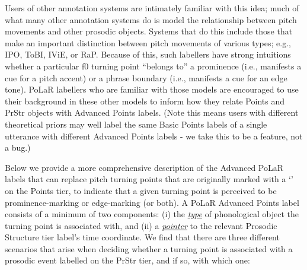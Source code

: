 \documentclass[11pt, twoside]{memoir}
\def\textlabel#1{{\relsize{-.5}\fontspec[Mapping=tex-text]{Roboto Mono}{#1}}}
\begin{document}
Users of other annotation systems are intimately familiar with this idea; much of what many other annotation systems do is model the relationship between pitch movements and other prosodic objects. Systems that do this include those that make an important distinction between pitch movements of various types; e.g., IPO, ToBI, IViE, or RaP. Because of this, such labellers have strong intuitions whether a particular f0 turning point “belongs to” a prominence (i.e., manifests a cue for a pitch accent) or a phrase boundary (i.e., manifests a cue for an edge tone). PoLaR labellers who are familiar with those models are encouraged to use their background in these other models to inform how they relate Points and PrStr objects with Advanced Points labels. (Note this means users with different theoretical priors may well label the same Basic Points labels of a single utterance with different Advanced Points labels - we take this to be a feature, not a bug.)

Below we provide a more comprehensive description of the Advanced PoLaR labels that can replace pitch turning points that are originally marked with a ‘\textlabel{0}’ on the Points tier, to indicate that a given turning point is perceived to be prominence-marking or edge-marking (or both). A PoLaR Advanced Points label consists of a minimum of two components: (i) the \textit{\uline{type}} of phonological object the turning point is associated with, and (ii) a \textit{\uline{pointer}} to the relevant Prosodic Structure tier label’s time coordinate. We find that there are three different scenarios that arise when deciding whether a turning point is associated with a prosodic event labelled on the PrStr tier, and if so, with which one:
\end{document}
